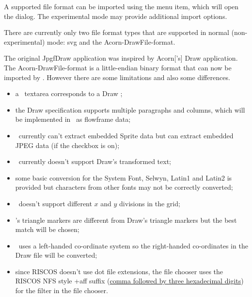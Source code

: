 
A supported file format can be imported using the 
menu item, which will open the  dialog. The
experimental mode may provide additional import options.

\begin{information}
There are currently only two file format types that are supported in
normal (non-experimental) mode: \gls{svg} and the
\gls{Acorn-DrawFile-format}.
\end{information}

The original \gls{JpgfDraw} application was inspired by \gls{Acorn}['s] Draw
application. The \gls{Acorn-DrawFile-format} is a little-endian binary format that can
now be imported by \FlowframTk. However there are some limitations
and also some differences.

\begin{itemize}
\item a \FlowframTk\ \gls{textarea} corresponds to a Draw ;
\item the Draw  specification supports multiple paragraphs
and columns, which will be implemented in \FlowframTk\ as
\gls{flowframe} data;
\item \FlowframTk\ currently can't extract embedded Sprite data
but can extract embedded JPEG data (if the
 checkbox is on);
\item \FlowframTk\ currently doesn't support Draw's transformed text;
\item some basic conversion for the System Font, Selwyn, Latin1 and
Latin2 is provided but characters from other fonts may not be
correctly converted;
\item \FlowframTk\ doesn't support different $x$ and $y$ divisions
in the \gls{grid};
\item \FlowframTk's triangle markers are different from
Draw's triangle markers but the best match will be chosen;
\item \FlowframTk\ uses a left-handed \gls{co-ordinate} system so the 
right-handed \glspl{co-ordinate} in the Draw file will be converted;
\item since \gls{RISCOS} doesn't use dot file extensions, the file
chooser uses the \gls{RISCOS} \gls{NFS} style \ext+{aff} suffix 
(\href{http://www.riscos.com/support/users/omniclient/6_filemap.html}{comma 
followed by three hexadecimal digits}) for the
 filter in the file chooser.
\end{itemize}

